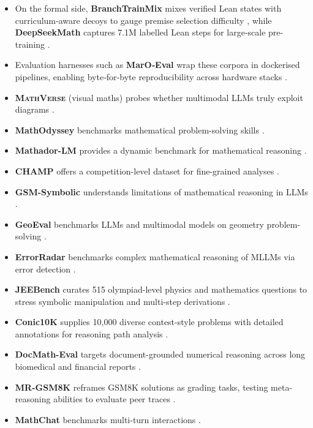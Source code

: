 \documentclass[acmsmall,anonymous]{acmart}
\begin{document}
\begin{itemize}
    \item On the formal side, \textbf{BranchTrainMix} mixes verified Lean states with curriculum‐aware decoys to gauge premise selection difficulty \cite{wang2024branchtrainmix}, while \textbf{DeepSeekMath} captures 7.1M labelled Lean steps for large‐scale pre-training \cite{shao2024deepseekmath}.  
    \item Evaluation harnesses such as \textbf{MarO‐Eval} wrap these corpora in dockerised pipelines, enabling byte‐for‐byte reproducibility across hardware stacks \cite{zhang2024marioeval}.  
    \item \textbf{\textsc{MathVerse}} (visual maths) probes whether multimodal LLMs truly exploit diagrams \cite{zhang2024mathverse}.
    \item \textbf{MathOdyssey} benchmarks mathematical problem-solving skills \cite{fang2024}.
    \item \textbf{Mathador-LM} provides a dynamic benchmark for mathematical reasoning \cite{kurtic2024}.
    \item \textbf{CHAMP} offers a competition-level dataset for fine-grained analyses \cite{mao2024}.
    \item \textbf{GSM-Symbolic} understands limitations of mathematical reasoning in LLMs \cite{mirzadeh2024}.
    \item \textbf{GeoEval} benchmarks LLMs and multimodal models on geometry problem-solving \cite{zhang2024d}.
    \item \textbf{ErrorRadar} benchmarks complex mathematical reasoning of MLLMs via error detection \cite{yan2024a}.
    \item \textbf{JEEBench} curates 515 olympiad-level physics and mathematics questions to stress symbolic manipulation and multi-step derivations \cite{arora-2023-jeebench}.
    \item \textbf{Conic10K} supplies 10{,}000 diverse contest-style problems with detailed annotations for reasoning path analysis \cite{wu-2023-conic10k}.
    \item \textbf{DocMath-Eval} targets document-grounded numerical reasoning across long biomedical and financial reports \cite{zhao-2024-docmatheval}.
    \item \textbf{MR-GSM8K} reframes GSM8K solutions as grading tasks, testing meta-reasoning abilities to evaluate peer traces \cite{zeng-2024-mr-gsm8k}.
    \item \textbf{MathChat} benchmarks multi-turn interactions \cite{liang2024c}.
\end{itemize}
\end{document}
